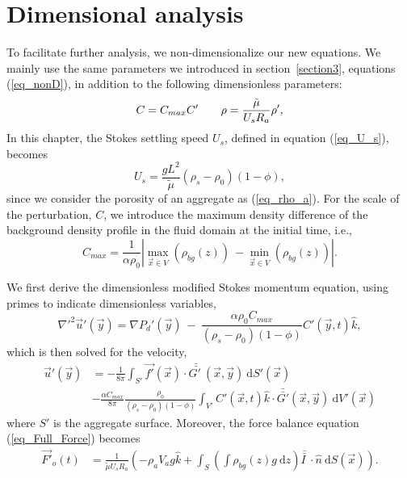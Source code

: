 \section{Dimensional analysis}
To facilitate further analysis, we non-dimensionalize our new equations. We mainly use the same parameters we introduced in section~\ref{section3}, equations (\ref{eq_nonD}), in addition to the following dimensionless parameters:
\begin{equation}
	C= C_{max} C'
\hspace{7mm}
\rho = \frac{\tilde{\mu}  }{{U_s} R_a}  \rho', 
\end{equation}
In this chapter, the Stokes settling speed $U_s$, defined in equation (\ref{eq_U_s}), becomes
\[
U_s = \frac{g  L^2}{\tilde{\mu}}(\rho_s - \rho_0)(1-\phi),
\] 
since we consider the porosity of an aggregate as (\ref{eq_rho_a}).
For the scale of the perturbation, $C$, we introduce the maximum density difference of the background density profile in the fluid domain at the initial time, i.e., 
\begin{equation}
C_{max} = 
\frac{1}{\alpha \rho_0}
\left|
\max_{\vec{x}\in V} \left(\rho_{bg}(z)  \right)
\ - \min_{\vec{x} \in V} \left(\rho_{bg}(z)  \right) \right|.
\end{equation}
\par
We first derive the dimensionless modified Stokes momentum equation, using primes to indicate dimensionless variables,
\begin{equation}
	{\nabla'}^2  \vec{u}'(\vec{y})
	= \nabla {P_d}'(\vec{y}) \ - \  
	\frac{\alpha \rho_0  C_{max}}{(\rho_s - \rho_0)(1-\phi)}  C'\left(\vec{y},t \right)   \hat{k},
\label{eq_extra_C_nonD}
\end{equation}
which is then solved for the velocity,
 \begin{align}
		\vec{u}'(\vec{y})
			  & =- \frac{1}{8 \pi} \int_{S'}  
			 \vec{f'}(\vec{x}) 
			 \cdot \bar{\bar{G' \ }} (\vec{x},\vec{y}) 
			 \ \textrm{d}S'(\vec{x})
			 \nonumber \\
& -\frac{ \alpha C_{max}}{8\pi } \frac{\rho_0}{(\rho_s - \rho_0)(1-\phi)} 
\int_{V'} C' \left(\vec{x},  t \right) \hat{k} \cdot 
\bar{\bar{G'  }}(\vec{x}, \vec{y} ) 
\ \text{d}V'(\vec{x})
  \label{eq_vel_all_onS_nonD}
 \end{align}
where $S'$ is the aggregate surface. 
Moreover, the force balance equation (\ref{eq_Full_Force}) becomes
\begin{align}
	 \vec{F'}_o(t)
	 & =
	  \frac{1}{\tilde{\mu} U_s R_a} 
	  \left(
	-   \rho_a V_a g \hat{k}
	  +
	   \int_{S} \left( 
	   \int \rho_{bg}(z) g \ \textrm{d}z 
	   \right) \bar{\bar{I \ }}  \cdot
	  \hat{n} \ \textrm{d}S (\vec{x})
	\right).
\label{eq_Full_Force_nonD}
\end{align}

